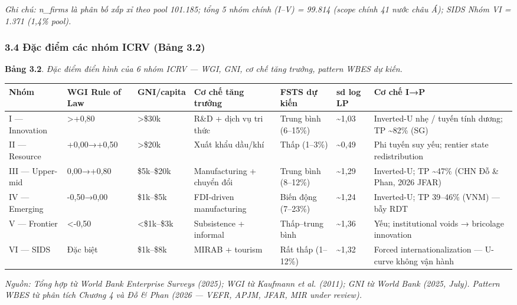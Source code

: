 \documentclass[12pt,a4paper]{article}
\begin{document}
\emph{Ghi chú: n\_firms là phân bố xấp xỉ theo pool 101.185; tổng 5 nhóm
chính (I--V) = 99.814 (scope chính 41 nước châu Á); SIDS Nhóm VI = 1.371
(1,4\% pool).}

\hypertarget{34-ux111ux1eb7c-ux111iux1ec3m-cuxe1c-nhuxf3m-icrv-bux1ea3ng-32}{%
\subsubsection{3.4 Đặc điểm các nhóm ICRV (Bảng
3.2)}\label{34-ux111ux1eb7c-ux111iux1ec3m-cuxe1c-nhuxf3m-icrv-bux1ea3ng-32}}

\textbf{Bảng 3.2}. \emph{Đặc điểm điển hình của 6 nhóm ICRV --- WGI,
GNI, cơ chế tăng trưởng, pattern WBES dự kiến.}

\begin{longtable}[]{@{}lllllll@{}}
\toprule\noalign{}
Nhóm & WGI Rule of Law & GNI/capita & Cơ chế tăng trưởng & FSTS dự kiến
& sd log LP & Cơ chế I→P \\
\midrule\noalign{}
\endhead
\bottomrule\noalign{}
\endlastfoot
I --- Innovation & \textgreater+0,80 & \textgreater\$30k & R\&D + dịch
vụ tri thức & Trung bình (6--15\%) & \textasciitilde1,03 & Inverted-U
nhẹ / tuyến tính dương; TP \textasciitilde82\% (SG) \\
II --- Resource & +0,00→+0,50 & \textgreater\$20k & Xuất khẩu dầu/khí &
Thấp (1--3\%) & \textasciitilde0,49 & Phi tuyến suy yếu; rentier state
redistribution \\
III --- Upper-mid & 0,00→+0,80 & \$5k--\$20k & Manufacturing + chuyển
đổi & Trung bình (8--12\%) & \textasciitilde1,29 & Inverted-U; TP
\textasciitilde47\% (CHN Đỗ \& Phan, 2026 JFAR) \\
IV --- Emerging & -0,50→0,00 & \$1k--\$5k & FDI-driven manufacturing &
Biến động (7--23\%) & \textasciitilde1,24 & Inverted-U; TP 39--46\%
(VNM) --- bẫy RDT \\
V --- Frontier & \textless-0,50 & \textless\$1k--\$3k & Subsistence +
informal & Thấp--trung bình & \textasciitilde1,36 & Yếu; institutional
voids → bricolage innovation \\
VI --- SIDS & Đặc biệt & \$1k--\$8k & MIRAB + tourism & Rất thấp
(1--12\%) & \textasciitilde1,32 & Forced internationalization ---
U-curve không vận hành \\
\end{longtable}

\emph{Nguồn: Tổng hợp từ World Bank Enterprise Surveys (2025); WGI từ
Kaufmann et al. (2011); GNI từ World Bank (2025, July). Pattern WBES từ
phân tích Chương 4 và Đỗ \& Phan (2026 --- VEFR, APJM, JFAR, MIR under
review).}
\end{document}
